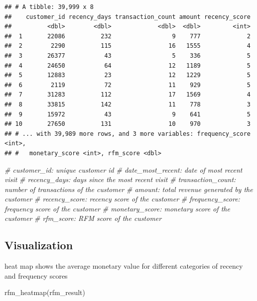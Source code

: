 \documentclass[
]{book}
\newenvironment{Shaded}{\begin{snugshade}}{\end{snugshade}}
\newcommand{\CommentTok}[1]{\textcolor[rgb]{0.56,0.35,0.01}{\textit{#1}}}
\newcommand{\FunctionTok}[1]{\textcolor[rgb]{0.00,0.00,0.00}{#1}}
\newcommand{\NormalTok}[1]{#1}
\begin{document}
\begin{verbatim}
## # A tibble: 39,999 x 8
##    customer_id recency_days transaction_count amount recency_score
##          <dbl>        <dbl>             <dbl>  <dbl>         <int>
##  1       22086          232                 9    777             2
##  2        2290          115                16   1555             4
##  3       26377           43                 5    336             5
##  4       24650           64                12   1189             5
##  5       12883           23                12   1229             5
##  6        2119           72                11    929             5
##  7       31283          112                17   1569             4
##  8       33815          142                11    778             3
##  9       15972           43                 9    641             5
## 10       27650          131                10    970             3
## # ... with 39,989 more rows, and 3 more variables: frequency_score <int>,
## #   monetary_score <int>, rfm_score <dbl>
\end{verbatim}

\begin{Shaded}
\begin{Highlighting}[]
\CommentTok{\# customer\_id: unique customer id}
\CommentTok{\# date\_most\_recent: date of most recent visit}
\CommentTok{\# recency\_days: days since the most recent visit}
\CommentTok{\# transaction\_count: number of transactions of the customer}
\CommentTok{\# amount: total revenue generated by the customer}
\CommentTok{\# recency\_score: recency score of the customer}
\CommentTok{\# frequency\_score: frequency score of the customer}
\CommentTok{\# monetary\_score: monetary score of the customer}
\CommentTok{\# rfm\_score: RFM score of the customer}
\end{Highlighting}
\end{Shaded}

\hypertarget{visualization}{%
\subsection{Visualization}\label{visualization}}

heat map shows the average monetary value for different categories of recency and frequency scores

\begin{Shaded}
\begin{Highlighting}[]
\FunctionTok{rfm\_heatmap}\NormalTok{(rfm\_result)}
\end{Highlighting}
\end{Shaded}
\end{document}
